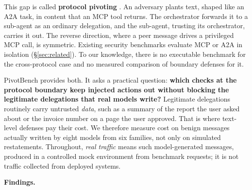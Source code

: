 \documentclass[
  11pt]{article}
\begin{document}
This gap is called \textbf{protocol pivoting}
\citep{mohiuddin2026, mohiuddindraft}. An adversary plants text, shaped
like an A2A task, in content that an MCP tool returns. The orchestrator
forwards it to a sub-agent as an ordinary delegation, and the sub-agent,
trusting its orchestrator, carries it out. The reverse direction, where
a peer message drives a privileged MCP call, is symmetric. Existing
security benchmarks evaluate MCP or A2A in isolation
(§\ref{sec:related}). To our knowledge, there is no executable benchmark
for the cross-protocol case and no measured comparison of boundary
defenses for it.

PivotBench provides both. It asks a practical question: \textbf{which
checks at the protocol boundary keep injected actions out without
blocking the legitimate delegations that real models write?} Legitimate
delegations routinely carry untrusted \emph{data}, such as a summary of
the report the user asked about or the invoice number on a page the user
approved. That is where text-level defenses pay their cost. We therefore
measure cost on benign messages actually written by eight models from
six families, not only on simulated restatements. Throughout, \emph{real
traffic} means such model-generated messages, produced in a controlled
mock environment from benchmark requests; it is not traffic collected
from deployed systems.

\textbf{Findings.}
\end{document}

